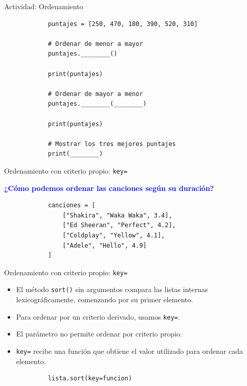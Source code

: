\documentclass{beamer}
\begin{document}
    \begin{frame}[fragile, t]{Actividad: Ordenamiento}
        \begin{verbatim}
            puntajes = [250, 470, 180, 390, 520, 310]

            # Ordenar de menor a mayor
            puntajes.________()
            
            print(puntajes)
            
            # Ordenar de mayor a menor
            puntajes.________(________)
            
            print(puntajes)
            
            # Mostrar los tres mejores puntajes
            print(________)
        \end{verbatim}
    \end{frame}

    \begin{frame}[fragile, t]{Ordenamiento con criterio propio: \texttt{key=}}

        \textcolor{blue}{\textbf{¿Cómo podemos ordenar las canciones según su duración?}}

        \begin{verbatim}
            canciones = [
                ["Shakira", "Waka Waka", 3.4],
                ["Ed Sheeran", "Perfect", 4.2],
                ["Coldplay", "Yellow", 4.1],
                ["Adele", "Hello", 4.9]
            ]
        \end{verbatim}
    \end{frame}

    \begin{frame}[fragile, t]{Ordenamiento con criterio propio: \texttt{key=}}
        \begin{itemize}
            \item El método \texttt{sort()} sin argumentos compara las listas internas 
            lexicográficamente, comenzando por su primer elemento.
            \item Para ordenar por un criterio derivado, usamos \texttt{key=}.
            \item El parámetro no permite ordenar por criterio propio.
            \item \texttt{key=} recibe una función que obtiene el valor utilizado 
            para ordenar cada elemento.
        \end{itemize}

        \vspace{0.5em}
        \begin{verbatim}
            lista.sort(key=funcion)
        \end{verbatim}
    \end{frame}
\end{document}
